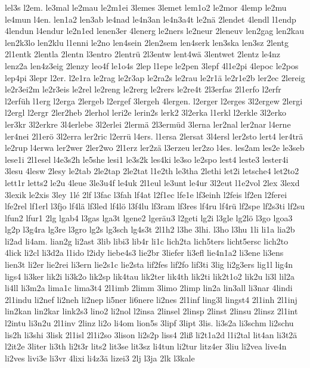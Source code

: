 {lel3s
l2em.
le3mal
le2mau
le2m1ei
3lemes
3lemet
lem1o2
le2mor
4lemp
le2mu
le4mun
l4en.
len1a2
len3ab
le4nad
le4n3an
le4n3a4t
le2nä
2lendet
4lendl
l1endp
4lendun
l4endur
le2n1ed
lenen3er
4lenerg
le2ners
le2neur
2leneuv
len2gag
len2kau
len2k3lo
len2klu
l1enni
le2no
len4sein
2len2sem
len4serk
len3ska
len3sz
2lentg
2l1entk
2lentla
2lentn
l3entro
2lentrü
2l3entw
lent4wä
3lentwet
2lentz
le4nz
lenz2a
len4z3eig
2lenzy
leo4f
le1o4s
2lep
l1epe
le2pen
3lepf
4l1e2pi
4lepoc
le2pos
lep4pi
3lepr
l2er.
l2e1ra
le2rag
le2r3ap
le2ra2s
le2rau
le2r1ä
le2r1e2b
ler2ec
2lereig
le2r3ei2m
le2r3eis
le2rel
le2reng
le2rerg
le2rers
le2re4t
2l3erfas
2l1erfo
l2erfr
l2erfüh
l1erg
l2erga
2lergeb
l2ergef
3lergeh
4lergen.
l2erger
l2erges
3l2ergew
2lergi
l2ergl
l2ergr
2ler2heb
2lerhol
leri2e
lerin2s
lerk2
3l2erka
l1erkl
l2erkle
3l2erko
ler3kr
3l2erkre
3l4erlebe
3l2erlei
2lermä
2l3ermüd
3lerna
ler2nal
ler2nar
l4erne
ler4nei
2l1erö
3l2erra
ler2ric
l2errü
l4ers.
l1ersa
2lersat
3l4ersl
ler2sto
lert4
ler4trä
le2rup
l4erwa
ler2wer
2ler2wo
2l1erz
ler2zä
l3erzeu
ler2zo
l4es.
les2am
les2e
le3seb
lese1i
2l1esel
l4e3s2h
le5she
lesi1
le3s2k
les4ki
le3so
le2spo
lest4
leste3
lester4i
3lesu
4lesw
2lesy
le2tab
2le2tap
2le2tat
l1e2th
le3tha
2lethi
let2i
letsche4
let2to2
lett1r
letts2
le2u
4leue
3le3u4f
le4uk
2l1eul
le3unt
le4ur
3l2eut
l1e2vol
2lex
3lexd
3lexik
le2xis
3ley
1lé
2lf
l3fac
l3fah
lf4at
l2f1ec
lfe1e
lf3einh
l2feis
lf2en
l2ferei
lfe2rel
lf1erl
l3fjo
lf4lä
lf3led
lf4lö
l3f4lu
lf3ram
lf3res
lf4ru
lf4rü
lf2spe
lf2s3ti
lf2su
lfun2
lfur1
2lg
lgab4
l3gas
lga3t
lgene2
lgeräu3
l2geti
lg2i
l3gle
lg2lö
l3go
lgoa3
lg2p
l3g4ra
lg3re
l3gro
lg2s
lg3sch
lg4s3t
2l1h2
l3he
3lhi.
l3ho
l3hu
1li
li1a
lia2b
li2ad
li4am.
lian2g
li2ast
3lib
libi3
lib4r
li1c
lich2ta
lich5ters
licht5ersc
lich2to
4lick
li2cl
li3d2a
l1ido
l2idy
liebe4s3
lie2br
3liefer
li3efl
lie4n1a2
li3ene
li3ens
lien3t
li2er
lie2rei
li3ern
lie2s1c
lie2sta
lif2fes
lif2fo
lif3ti
3lig
li2g3ers
lig1l
lig4n
ligs4
li3ker
lik2i
li3k2o
lik2sp
lik4tau
lik2ter
lik4th
lik2ti
lik2t1o2
lik2u
li3l
lil2a
li4ll
li3m2a
lima1c
lima3t4
2l1imb
2limm
3limo
2limp
lin2a
lin3all
li3nar
4lindi
2l1indu
li2nef
li2neh
li2nep
li5ner
li6nere
li2nes
2l1inf
ling3l
lingst4
2l1inh
2l1inj
lin2kan
lin2kar
link2s3
lino2
li2nol
l2insa
2linsel
2linsp
2linst
2linsu
2linsz
2l1int
l2intu
li3n2u
2l1inv
2linz
li2o
li4om
lion5s
3lipf
3lipt
3lis.
li3s2a
li3schm
li2schu
lis2h
li3shi
3lisk
2l1isl
2l1i2so
3lison
li2s2p
liss4
2liß
li2t1a2d
l1i2tal
lit4an
li3t2ä
l2it2e
3liter
li3th
li2t3r
lits2
lit3se
lit3sz
li4tun
li2tur
litz4er
3liu
li2vea
live4n
li2ves
livi3e
li3vr
4lixi
li4z3ä
lizei3
2lj
l3ja
2lk
l3kale
}
